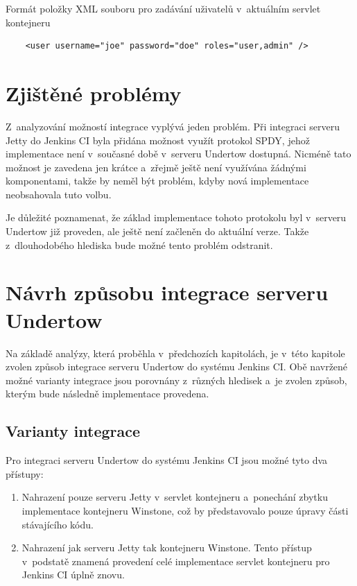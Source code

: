 \begin{priklad} \label{prUsers}
    Formát položky XML souboru pro zadávání uživatelů v~aktuálním servlet kontejneru
\begin{verbatim}
    <user username="joe" password="doe" roles="user,admin" />
\end{verbatim}
\end{priklad}


    \section{Zjištěné problémy} \label{kapSpdy}
        Z~analyzování možností integrace vyplývá jeden problém.
        Při integraci serveru Jetty do Jenkins CI byla přidána
        možnost využít protokol SPDY, jehož implementace
        není v~současné době v~serveru Undertow dostupná. Nicméně tato možnost
        je zavedena jen krátce a~zřejmě ještě není využívána žádnými komponentami,
        takže by neměl být problém, kdyby nová implementace neobsahovala tuto volbu.
        
        Je důležité poznamenat, že základ implementace tohoto protokolu byl
v~serveru Undertow již proveden, ale ještě není začleněn do aktuální 
        verze. Takže z~dlouhodobého hlediska bude možné tento problém odstranit.

    \section{Návrh způsobu integrace serveru Undertow} \label{secNavrh}
        Na základě analýzy, která proběhla v~předchozích kapitolách,
        je v~této kapitole zvolen způsob
        integrace serveru Undertow do systému Jenkins CI. 
        Obě navržené možné varianty integrace jsou porovnány z~různých
        hledisek a~je zvolen způsob, kterým bude následně implementace provedena.

                
        \subsection{Varianty integrace}
            Pro integraci serveru Undertow do systému Jenkins CI jsou možné tyto dva přístupy:

            \begin{enumerate}
                \item{Nahrazení pouze serveru Jetty v~servlet kontejneru a~ponechání
                    zbytku implementace kontejneru Winstone, což by představovalo
                    pouze úpravy části stávajícího kódu. }

                \item{Nahrazení jak serveru Jetty tak kontejneru Winstone. 
                    Tento přístup v~podstatě znamená provedení celé implementace
                    servlet kontejneru pro Jenkins CI úplně znovu.}
            \end{enumerate}


